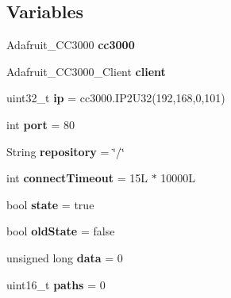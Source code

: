 \subsection*{Variables}
\begin{DoxyCompactItemize}
\item 
Adafruit\+\_\+\+C\+C3000 {\bfseries cc3000}
\item 
\hypertarget{compressed_sensing_8ino_abbac84d8b4ff1602f8df3309331e81be}{Adafruit\+\_\+\+C\+C3000\+\_\+\+Client {\bfseries client}}\label{compressed_sensing_8ino_abbac84d8b4ff1602f8df3309331e81be}

\item 
\hypertarget{compressed_sensing_8ino_a69ddb9c845da426f636d9dd0dbed4e7e}{uint32\+\_\+t {\bfseries ip} = cc3000.\+I\+P2\+U32(192,168,0,101)}\label{compressed_sensing_8ino_a69ddb9c845da426f636d9dd0dbed4e7e}

\item 
\hypertarget{compressed_sensing_8ino_a63c89c04d1feae07ca35558055155ffb}{int {\bfseries port} = 80}\label{compressed_sensing_8ino_a63c89c04d1feae07ca35558055155ffb}

\item 
\hypertarget{compressed_sensing_8ino_a15e669cf77f4c9525d31f954fb060807}{String {\bfseries repository} = \char`\"{}/\char`\"{}}\label{compressed_sensing_8ino_a15e669cf77f4c9525d31f954fb060807}

\item 
\hypertarget{compressed_sensing_8ino_a38c6aa24b36d981c49405db425c24db0}{int {\bfseries connect\+Timeout} = 15\+L $\ast$ 10000\+L}\label{compressed_sensing_8ino_a38c6aa24b36d981c49405db425c24db0}

\item 
\hypertarget{compressed_sensing_8ino_ab30ba07e2a0bd07a15e45a92c32db9c5}{bool {\bfseries state} = true}\label{compressed_sensing_8ino_ab30ba07e2a0bd07a15e45a92c32db9c5}

\item 
\hypertarget{compressed_sensing_8ino_a7aafc743302894a43d26b00075cc553b}{bool {\bfseries old\+State} = false}\label{compressed_sensing_8ino_a7aafc743302894a43d26b00075cc553b}

\item 
\hypertarget{compressed_sensing_8ino_ad6eab33201496ee923f45155e6a47b58}{unsigned long {\bfseries data} = 0}\label{compressed_sensing_8ino_ad6eab33201496ee923f45155e6a47b58}

\item 
\hypertarget{compressed_sensing_8ino_a2563328cda49f11e3c4f0c8c81778167}{uint16\+\_\+t {\bfseries paths} = 0}\label{compressed_sensing_8ino_a2563328cda49f11e3c4f0c8c81778167}


\end{DoxyCompactItemize}
